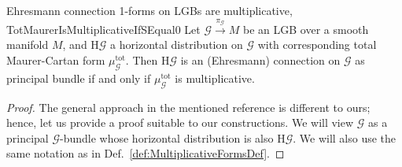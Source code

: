 \documentclass[a4paper,oneside,11pt,bibliography=totoc]{scrartcl}
\theoremstyle{plain}
\theoremstyle{remark}
\theoremstyle{definition}
\begin{document}
\begin{theorems}{Ehresmann connection 1-forms on LGBs are multiplicative, \newline \cite[\S 4.4, implication of Lemma 4.14]{LAURENTGENGOUXStienonXuMultiplicativeForms}}{TotMaurerIsMultiplicativeIfSEqual0}
Let $\mathcal{G} \stackrel{\pi_{\mathcal{G}}}{\to} M$ be an LGB over a smooth manifold $M$, and $\mathrm{H}\mathcal{G}$ a horizontal distribution on $\mathcal{G}$ with corresponding total Maurer-Cartan form $\mu_{\mathcal{G}}^{\mathrm{tot}}$. Then $\mathrm{H}\mathcal{G}$ is an (Ehresmann) connection on $\mathcal{G}$ as principal bundle if and only if $\mu_{\mathcal{G}}^{\mathrm{tot}}$ is multiplicative.
\end{theorems}

\begin{proof}
\leavevmode\newline
The general approach in the mentioned reference is different to ours; hence, let us provide a proof suitable to our constructions. We will view $\mathcal{G}$ as a principal $\mathcal{G}$-bundle whose horizontal distribution is also $\mathrm{H}\mathcal{G}$. We will also use the same notation as in Def.\ \ref{def:MultiplicativeFormsDef}.


\end{proof}
\end{document}

